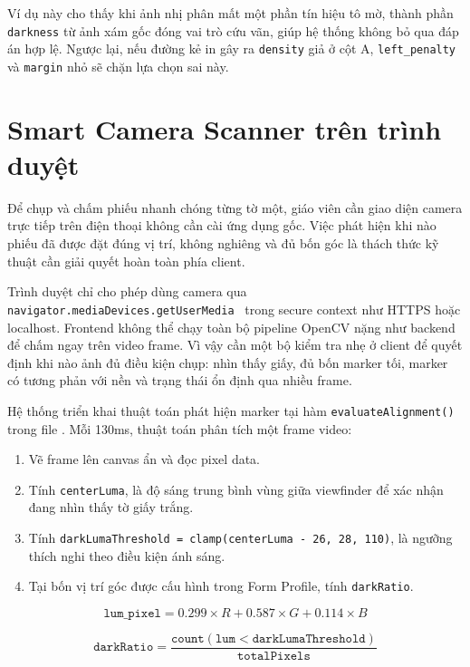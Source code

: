 Ví dụ này cho thấy khi ảnh nhị phân mất một phần tín hiệu tô mờ, thành phần \texttt{darkness} từ ảnh xám gốc đóng vai trò cứu vãn, giúp hệ thống không bỏ qua đáp án hợp lệ. Ngược lại, nếu đường kẻ in gây ra \texttt{density} giả ở cột A, \texttt{left\_penalty} và \texttt{margin} nhỏ sẽ chặn lựa chọn sai này.

\section{Smart Camera Scanner trên trình duyệt}

Để chụp và chấm phiếu nhanh chóng từng tờ một, giáo viên cần giao diện camera trực tiếp trên điện thoại không cần cài ứng dụng gốc. Việc phát hiện khi nào phiếu đã được đặt đúng vị trí, không nghiêng và đủ bốn góc là thách thức kỹ thuật cần giải quyết hoàn toàn phía client.

Trình duyệt chỉ cho phép dùng camera qua \texttt{navigator.mediaDevices.getUserMedia}~\cite{webrtc} trong secure context như HTTPS hoặc localhost. Frontend không thể chạy toàn bộ pipeline OpenCV nặng như backend để chấm ngay trên video frame. Vì vậy cần một bộ kiểm tra nhẹ ở client để quyết định khi nào ảnh đủ điều kiện chụp: nhìn thấy giấy, đủ bốn marker tối, marker có tương phản với nền và trạng thái ổn định qua nhiều frame.

Hệ thống triển khai thuật toán phát hiện marker tại hàm \texttt{evaluateAlignment()} trong file . Mỗi 130ms, thuật toán phân tích một frame video:

\begin{enumerate}
    \item Vẽ frame lên canvas ẩn và đọc pixel data.
    \item Tính \texttt{centerLuma}, là độ sáng trung bình vùng giữa viewfinder để xác nhận đang nhìn thấy tờ giấy trắng.
    \item Tính \texttt{darkLumaThreshold = clamp(centerLuma - 26, 28, 110)}, là ngưỡng thích nghi theo điều kiện ánh sáng.
    \item Tại bốn vị trí góc được cấu hình trong Form Profile, tính \texttt{darkRatio}.
\end{enumerate}

\begin{equation}
\texttt{lum\_pixel}
=
0.299 \times R
+
0.587 \times G
+
0.114 \times B
\end{equation}

\begin{equation}
\texttt{darkRatio}
=
\frac{\texttt{count}(\texttt{lum} < \texttt{darkLumaThreshold})}
{\texttt{totalPixels}}
\end{equation}

